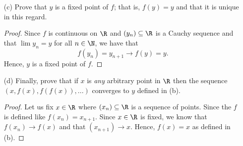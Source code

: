 \begin{enumerate}
\begin{proof}
\begin{align*}
        \end{align*}
    Let \( \epsilon > 0  \), and choose \( N \in \N  \) large enough so that \( c^{N-1} < \epsilon 1 - c / | y_1 - y_2  |   \). Then the previous calculation shows that \( n > m \geq N  \) implies \( | y_m - y_n  | < \epsilon  \); that is, we have
    \begin{align*}
        | y_{m+1} - y_{n+1} | &\leq | y_m - y_n  |  \\
                            &< c^{N-1} | y_1 - y_2  | \Big( \frac{ 1 }{ 1 - c  }   \Big) \\
                            &< \frac{ \epsilon (1 - c ) }{ | y_1 - y_2  |  } \cdot \frac{ | y_1 - y_2  |  }{ 1 -c  } \\ 
                            &= \epsilon.
    \end{align*}
    Hence, \( (y_n) \) is Cauchy Sequence.
\end{proof}
\item[(c)] Prove that \( y  \) is a fixed point of \( f \); that is, \( f(y) = y  \) and that it is unique in this regard.
    \begin{proof}
    Since \( f  \) is continuous on \( \R  \) and \( (y_n) \subseteq \R  \) is a Cauchy sequence and that \( \lim y_n = y  \) for all \( n \in \N  \), we have that 
    \[ f(y_n) = y_{n+1} \to f(y) = y.  \]
    Hence, \( y \) is a fixed point of \( f \).
    \end{proof}
    \item[(d)] Finally, prove that if \( x \) is \textit{any} arbitrary point in \( \R  \) then the sequence \( (x, f(x), f(f(x)),...) \) converges to \( y \) defined in (b).
        \begin{proof}
            Let us fix \( x \in \R  \) where \( (x_n) \subseteq \R  \) is a sequence of points. Since the \( f \) is defined like  \( f(x_{n}) = x_{n+1}   \). Since \( x \in \R  \) is fixed, we know that \( f(x_n) \to f(x) \) and that \( (x_{n+1}) \to  x  \). Hence, \( f(x) = x  \) as defined in (b). 
        \end{proof}
\end{enumerate}


